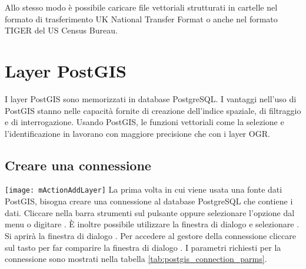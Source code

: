 Allo stesso modo è possibile caricare file vettoriali strutturati in cartelle nel formato 
di trasferimento UK National Transfer Format o anche nel formato TIGER del US Census Bureau.

\section{Layer PostGIS}
\label{label_postgis} 

I layer PostGIS sono memorizzati in database PostgreSQL. I vantaggi
nell'uso di PostGIS stanno nelle capacità fornite di creazione dell'indice spaziale,
di filtraggio e di interrogazione. Usando PostGIS, le funzioni
vettoriali come la selezione e l'identificazione in \qg lavorano con maggiore
precisione che con i layer OGR.

\subsection{Creare una connessione}\label{sec:postgis_stored}

\texttt{[image: mActionAddLayer]} La prima volta in cui viene
usata una fonte dati PostGIS, bisogna creare una connessione al database
PostgreSQL che contiene i dati. Cliccare nella barra strumenti sul pulsante
 oppure selezionare l'opzione
 dal menu
 o digitare . È inoltre possibile 
utilizzare la finestra di dialogo  e selezionare 
.
Si aprirà  la finestra di dialogo . Per
accedere al gestore della connessione  
cliccare sul tasto  per far comparire la finestra di
dialogo . I parametri richiesti
per la connessione sono mostrati nella tabella \ref{tab:postgis_connection_parms}.

